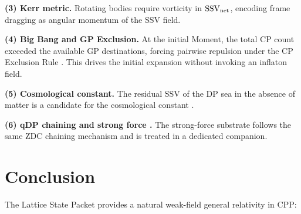 \documentclass[12pt]{article}
\newcommand{\SSV}{\text{SSV}}
\begin{document}
\textbf{(3) Kerr metric.}  Rotating bodies require vorticity in
$\mathbf{\SSV}_{\rm net}$, encoding frame dragging as angular momentum
of the SSV field.

\textbf{(4) Big Bang and GP Exclusion.}  At the initial Moment, the
total CP count exceeded the available GP destinations, forcing pairwise
repulsion under the CP Exclusion Rule \citep{abshier2026am}.  This
drives the initial expansion without invoking an inflaton field.

\textbf{(5) Cosmological constant.}  The residual SSV of the DP sea
in the absence of matter is a candidate for the cosmological constant
\citep{abshier2026series}.

\textbf{(6) qDP chaining and strong force \citep{abshier2026series}.}
The strong-force substrate follows the same ZDC chaining mechanism
\citep{abshier2026zdc} and is treated in a dedicated companion.

\section{Conclusion}
\label{sec:conclusion}

The Lattice State Packet provides a natural weak-field general
relativity in CPP:
\end{document}
